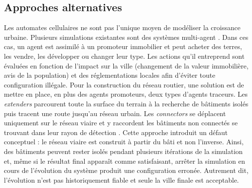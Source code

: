 \documentclass[12pt]{article}
\begin{document}
\subsection{Approches alternatives}

Les automates cellulaires ne sont pas l'unique moyen de modéliser la
croissance urbaine. Plusieurs simulations existantes sont des systèmes
multi-agent \cite{Lechner2003,Lechner2004}. Dans ces cas, un agent est
assimilé à un promoteur immobilier et peut acheter des terres, les
vendre, les développer ou changer leur type. Les actions qu'il
entreprend sont évaluées en fonction de l'impact sur la ville
(changement de la valeur immobilière, avis de la population) et des
réglementations locales afin d'éviter toute configuration illégale.
Pour la construction du réseau routier, une solution est de mettre en
place, en plus des agents promoteurs, deux types d'agents
traceurs. Les \textit{extenders} parcourent toute la surface du
terrain à la recherche de bâtiments isolés puis tracent une route
jusqu'au réseau urbain. Les \textit{connectors} se déplacent
uniquement sur le réseau viaire et y raccordent les bâtiments non
connectés se trouvant dans leur rayon de détection
\cite{Lechner2003}. Cette approche introduit un défaut conceptuel : le
réseau viaire est construit à partir du bâti et non l'inverse. Ainsi,
des bâtiments peuvent rester isolés pendant plusieurs itérations de la
simulation et, même si le résultat final apparaît comme satisfaisant,
arrêter la simulation en cours de l'évolution du système produit une
configuration erronée. Autrement dit, l'évolution n'est pas
historiquement fiable et seule la ville finale est acceptable.
\end{document}
